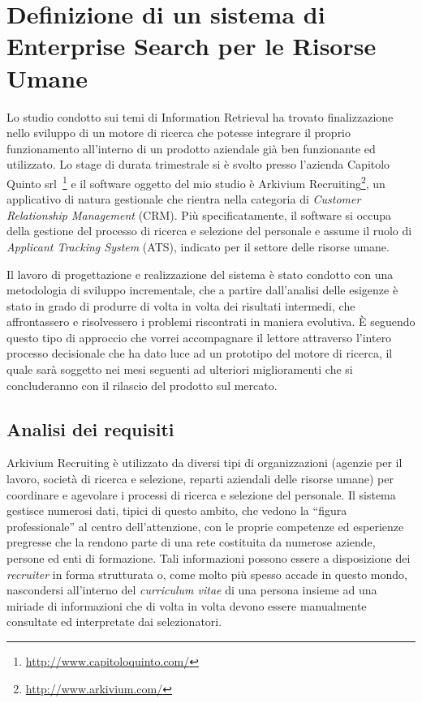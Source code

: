 \chapter{Definizione di un sistema di Enterprise Search per le Risorse Umane}

Lo studio condotto sui temi di Information Retrieval ha trovato finalizzazione nello sviluppo di un motore di ricerca che potesse integrare il proprio funzionamento all’interno di un prodotto aziendale già ben funzionante ed utilizzato. Lo stage di durata trimestrale si è svolto presso l’azienda Capitolo Quinto srl~\footnote{\url{http://www.capitoloquinto.com/}} e il software oggetto del mio studio è Arkivium Recruiting\footnote{\url{http://www.arkivium.com/}}, un applicativo di natura gestionale che rientra nella categoria di \textit{Customer Relationship Management} (CRM). Più specificatamente, il software si occupa della gestione del processo di ricerca e selezione del personale e assume il ruolo di \textit{Applicant Tracking System} (ATS), indicato per il settore delle risorse umane.

Il lavoro di progettazione e realizzazione del sistema è stato condotto con una metodologia di sviluppo incrementale, che a partire dall’analisi delle esigenze è stato in grado di produrre di volta in volta dei risultati intermedi, che affrontassero e risolvessero i problemi riscontrati in maniera evolutiva. È seguendo questo tipo di approccio che vorrei accompagnare il lettore attraverso l’intero processo decisionale che ha dato luce ad un prototipo del motore di ricerca, il quale sarà soggetto nei mesi seguenti ad ulteriori miglioramenti che si concluderanno con il rilascio del prodotto sul mercato.




\section{Analisi dei requisiti}

Arkivium Recruiting è utilizzato da diversi tipi di organizzazioni (agenzie per il lavoro, società di ricerca e selezione, reparti aziendali delle risorse umane) per coordinare e agevolare i processi di ricerca e selezione del personale. Il sistema gestisce numerosi dati, tipici di questo ambito, che vedono la “figura professionale” al centro dell’attenzione, con le proprie competenze ed esperienze pregresse che la rendono parte di una rete costituita da numerose aziende, persone ed enti di formazione. Tali informazioni possono essere a disposizione dei \textit{recruiter} in forma strutturata o, come molto più spesso accade in questo mondo, nascondersi all’interno del \textit{curriculum vitae} di una persona insieme ad una miriade di informazioni che di volta in volta devono essere manualmente consultate ed interpretate dai selezionatori.

